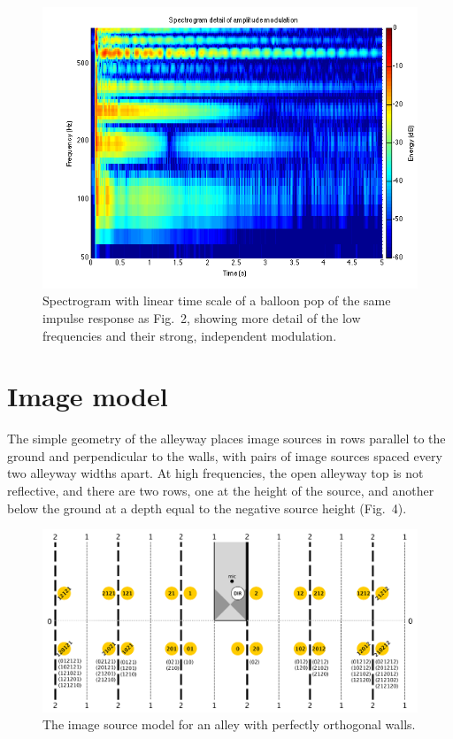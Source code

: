 \documentclass{aes137}
\begin{document}
\begin{figure}[h!] \centering \includegraphics[width=\linewidth, trim=10mm 5mm 2mm 3mm, clip]{images/logspectrogram_evenmoredetail.png} \caption{Spectrogram with linear time scale of a balloon pop of the same impulse response as Fig.~2, showing more detail of the low frequencies and their strong, independent modulation.} \end{figure}

\section{Image model}
The simple geometry of the alleyway places image sources in rows parallel to the ground and perpendicular to the walls, with pairs of image sources spaced every two alleyway widths apart. At high frequencies, the open alleyway top is not reflective, and there are two rows, one at the height of the source, and another below the ground at a depth equal to the negative source height (Fig.~4). 

\begin{figure}[h!] \centering \includegraphics[width=\linewidth]{images/ISM_uncanted.pdf} \caption{The image source model for an alley with perfectly orthogonal walls.} \end{figure}
\end{document}
